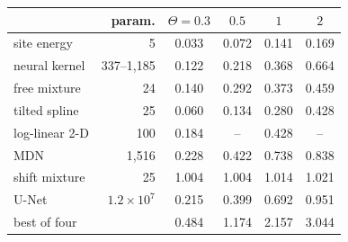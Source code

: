 \begin{tabular}{@{}lrcccc@{}}
\toprule
 & param. & $\Theta=0.3$ & $0.5$ & $1$ & $2$\\
\midrule
site energy & 5 & 0.033 & 0.072 & 0.141 & 0.169\\
neural kernel & 337--1{,}185 & 0.122 & 0.218 & 0.368 & 0.664\\
free mixture & 24 & 0.140 & 0.292 & 0.373 & 0.459\\
tilted spline & 25 & 0.060 & 0.134 & 0.280 & 0.428\\
log-linear 2-D & 100 & 0.184 & -- & 0.428 & --\\
MDN & 1{,}516 & 0.228 & 0.422 & 0.738 & 0.838\\
shift mixture & 25 & 1.004 & 1.004 & 1.014 & 1.021\\
\midrule
U-Net & $1.2\times10^{7}$ & 0.215 & 0.399 & 0.692 & 0.951\\
best of four &  & 0.484 & 1.174 & 2.157 & 3.044\\
\bottomrule
\end{tabular}
